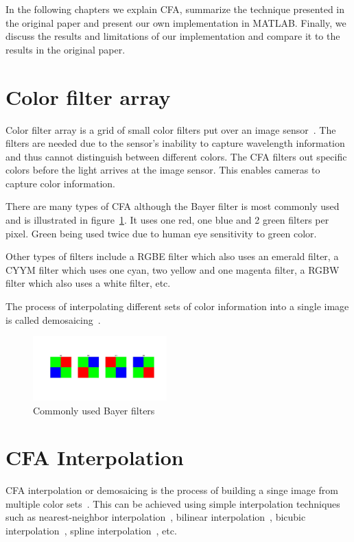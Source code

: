 \documentclass{template/acm_proc_article-sp}
\begin{document}
In the following chapters we explain CFA, summarize the technique presented 
in the original paper and present our own implementation in MATLAB.
Finally, we discuss the results and limitations of our implementation and compare it
to the results in the original paper.

\section{Color filter array}
Color filter array is a grid of small color 
filters put over an image sensor~\cite{cfawiki}.
The filters are needed due to the sensor's inability to capture wavelength 
information and thus cannot distinguish between different colors.
The CFA filters out specific colors before the light arrives at the image sensor.
This enables cameras to capture color information.

There are many types of CFA although the Bayer filter is most commonly used and is 
illustrated in figure~\ref{img_4_bayer_filters}.
It uses one red, one blue and 2 green filters per pixel. 
Green being used twice due to human eye sensitivity to green color.

Other types of filters include a RGBE filter which also uses an emerald filter, a CYYM
filter which uses one cyan, two yellow and one magenta filter, a RGBW filter which also uses a white filter, etc.

The process of interpolating different sets of color information into a single image 
is called demosaicing~\cite{demowiki}.

\begin{figure}
\centering
\includegraphics[trim=175 200 100 205,clip,width=0.46\textwidth]{report/results/4_bayer_filters.jpg}
\caption{Commonly used Bayer filters}
\label{img_4_bayer_filters}
\end{figure}

\section{CFA Interpolation}
CFA interpolation or demosaicing is the process of building a singe image from
multiple color sets~\cite{demowiki}. 
This can be achieved using simple interpolation techniques such as 
nearest-neighbor interpolation~\cite{nnwiki}, bilinear interpolation~\cite{bilwiki}, 
bicubic interpolation~\cite{bicwiki}, spline interpolation~\cite{splinewiki}, etc.
\end{document}
